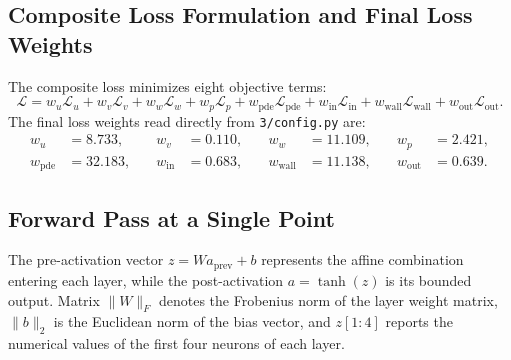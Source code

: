 \documentclass[11pt,a4paper]{article}
\begin{document}
\subsection{Composite Loss Formulation and Final Loss Weights}
The composite loss minimizes eight objective terms:
\begin{equation}
\mathcal{L} = w_{u}\mathcal{L}_{u} + w_{v}\mathcal{L}_{v} + w_{w}\mathcal{L}_{w} + w_{p}\mathcal{L}_{p} + w_{\mathrm{pde}}\mathcal{L}_{\mathrm{pde}} + w_{\mathrm{in}}\mathcal{L}_{\mathrm{in}} + w_{\mathrm{wall}}\mathcal{L}_{\mathrm{wall}} + w_{\mathrm{out}}\mathcal{L}_{\mathrm{out}}.
\end{equation}
The final loss weights read directly from \texttt{3/config.py} are:
\begin{equation}
\begin{aligned}
w_{u} &= 8.733, \quad & w_{v} &= 0.110, \quad & w_{w} &= 11.109, \quad & w_{p} &= 2.421, \\
w_{\mathrm{pde}} &= 32.183, \quad & w_{\mathrm{in}} &= 0.683, \quad & w_{\mathrm{wall}} &= 11.138, \quad & w_{\mathrm{out}} &= 0.639.
\end{aligned}
\end{equation}

\subsection{Forward Pass at a Single Point}
The pre-activation vector $z = W a_{\mathrm{prev}} + b$ represents the affine combination entering each layer, while the post-activation $a = \tanh(z)$ is its bounded output. Matrix $\|W\|_F$ denotes the Frobenius norm of the layer weight matrix, $\|b\|_2$ is the Euclidean norm of the bias vector, and $z[1:4]$ reports the numerical values of the first four neurons of each layer.
\end{document}
